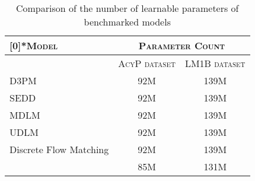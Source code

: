 \begin{table}[H]
\centering
\caption{Comparison of the number of learnable parameters of benchmarked models}
\begin{tabular}{>{\centering\arraybackslash}m{5cm}|cc}
\toprule
\multirow{2}[0]{*}{\textsc{Model}} & \multicolumn{2}{c}{\textsc{Parameter Count}} \\ 
\cmidrule(r){2-3}
                                      & \textsc{AcyP dataset} & \textsc{LM1B dataset} \\ \midrule
D3PM                                  & 92M                  & 139M                 \\
SEDD                                  & 92M                  & 139M                 \\
MDLM                                  & 92M                  & 139M                 \\
UDLM                                  & 92M                  & 139M                 \\
Discrete Flow Matching                & 92M                  & 139M                 \\ \midrule
\textbf{\method{}}                     & 85M                  & 131M                 \\ \bottomrule
\end{tabular}
\label{tab:parameter_count}
\end{table}
